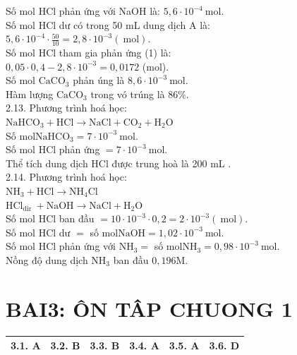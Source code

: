 \documentclass[10pt]{article}
\begin{document}
Số mol HCl phản ứng với NaOH là: $5,6 \cdot 10^{-4} \mathrm{~mol}$.\\
Số mol HCl dư có trong 50 mL dung dịch A là:\\
$5,6 \cdot 10^{-4} \cdot \frac{50}{10}=2,8 \cdot 10^{-3}(\mathrm{~mol})$.\\
Số mol HCl tham gia phản ứng (1) là:\\
$0,05 \cdot 0,4-2,8 \cdot 10^{-3}=0,0172$ (mol).\\
Số mol $\mathrm{CaCO}_{3}$ phản úng là $8,6 \cdot 10^{-3} \mathrm{~mol}$.\\
Hàm lượng $\mathrm{CaCO}_{3}$ trong vó trúng là $86 \%$.\\
2.13. Phương trình hoá học:\\
$\mathrm{NaHCO}_{3}+\mathrm{HCl} \longrightarrow \mathrm{NaCl}+\mathrm{CO}_{2}+\mathrm{H}_{2} \mathrm{O}$\\
Số $\mathrm{mol} \mathrm{NaHCO}_{3}=7 \cdot 10^{-3} \mathrm{~mol}$.\\
Số mol HCl phản ứng $=7 \cdot 10^{-3} \mathrm{~mol}$.\\
Thể tích dung dịch HCl được trung hoà là 200 mL .\\
2.14. Phương trình hoá học:\\
$\mathrm{NH}_{3}+\mathrm{HCl} \longrightarrow \mathrm{NH}_{4} \mathrm{Cl}$\\
$\mathrm{HCl}_{\text {dir }}+\mathrm{NaOH} \longrightarrow \mathrm{NaCl}+\mathrm{H}_{2} \mathrm{O}$\\
Số mol HCl ban đầu $=10 \cdot 10^{-3} \cdot 0,2=2 \cdot 10^{-3}(\mathrm{~mol})$.\\
Số mol HCl dư $=$ số $\mathrm{mol} \mathrm{NaOH}=1,02 \cdot 10^{-3} \mathrm{~mol}$.\\
Số mol HCl phản ứng với $\mathrm{NH}_{3}=$ số $\mathrm{mol} \mathrm{NH}_{3}=0,98 \cdot 10^{-3} \mathrm{~mol}$.\\
Nồng độ dung dịch $\mathrm{NH}_{3}$ ban đầu $0,196 \mathrm{M}$.

\section*{BAI3: ÔN TÂP CHUONG 1}
\begin{center}
\begin{tabular}{|l|l|l|l|l|l|}
\hline
3.1. A & 3.2. B & 3.3. B & 3.4. A & 3.5. A & 3.6. D \\
\hline
\end{tabular}
\end{center}
\end{document}
